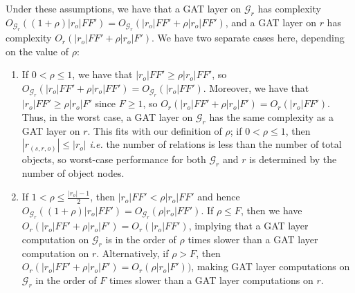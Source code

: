 Under these assumptions, we have that a GAT layer on \(\mathcal{G}_r\) has complexity \(O_{\mathcal{G}_r}((1 + \rho)|r_o|FF') = O_{\mathcal{G}_r}(|r_o|FF' + \rho|r_o|FF')\), and a GAT layer on \(r\) has complexity  \(O_r(|r_o|FF' + \rho|r_o|F')\). We have two separate cases here, depending on the value of \(\rho\):

\begin{enumerate}
    \item If \(0 < \rho \leq 1\), we have that \(|r_o|FF' \geq \rho|r_o|FF'\), so \(O_{\mathcal{G}_r}(|r_o|FF' + \rho|r_o|FF') = O_{\mathcal{G}_r}(|r_o|FF')\). Moreover, we have that \(|r_o|FF' \geq \rho|r_o|F'\) since \(F \geq 1\), so \(O_r(|r_o|FF' + \rho|r_o|F') = O_r(|r_o|FF')\). Thus, in the worst case, a GAT layer on \(\mathcal{G}_r\) has the same complexity as a GAT layer on \(r\). This fits with our definition of \(\rho\); if \(0 < \rho \leq 1\), then \(|r_{(s,r,o)}| \leq |r_o|\) \textit{i.e.} the number of relations is less than the number of total objects, so worst-case performance for both \(\mathcal{G}_r\) and \(r\) is determined by the number of object nodes.
    \item If \(1 < \rho \leq \frac{|r_o| - 1}{2}\), then \(|r_o|FF' < \rho|r_o|FF'\)
    and hence \(O_{\mathcal{G}_r}((1 + \rho)|r_o|FF') = O_{\mathcal{G}_r}(\rho|r_o|FF')\). If \(\rho \leq F\), then we have \(O_r(|r_o|FF' + \rho|r_o|F') = O_r(|r_o|FF')\), implying that a GAT layer computation on \(\mathcal{G}_r\) is in the order of \(\rho\) times slower than a GAT layer computation on \(r\). Alternatively, if \(\rho > F\), then \(O_r(|r_o|FF' + \rho|r_o|F') = O_r(\rho|r_o|F'))\), making GAT layer computations on \(\mathcal{G}_r\) in the order of \(F\) times slower than a GAT layer computations on \(r\).
\end{enumerate}



